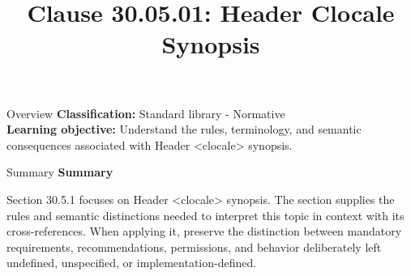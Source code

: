 \documentclass[10pt,letterpaper]{article}
\title{Clause 30.05.01: Header Clocale Synopsis}
\author{}
\date{}
\begin{document}
\maketitle
\begin{CornellOverviewBox}{Overview}
\textbf{Classification:} Standard library - Normative\\[2pt]
\textbf{Learning objective:} Understand the rules, terminology, and semantic consequences associated with Header <clocale> synopsis.
\end{CornellOverviewBox}\begin{CornellSummaryBox}{Summary}
{\sffamily\bfseries\color{Accent} Summary}\par\vspace{3pt}Section 30.5.1 focuses on Header <clocale> synopsis. The section supplies the rules and semantic distinctions needed to interpret this topic in context with its cross-references. When applying it, preserve the distinction between mandatory requirements, recommendations, permissions, and behavior deliberately left undefined, unspecified, or implementation-defined.
\end{CornellSummaryBox}
\end{document}
